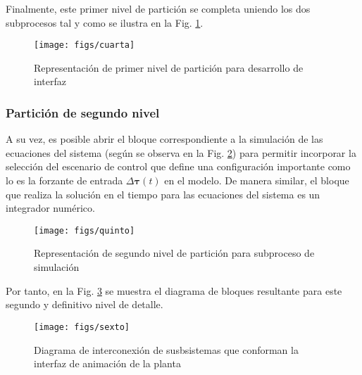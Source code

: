\noindent Finalmente, este primer nivel de partición se completa uniendo los dos subprocesos tal y como se ilustra en la Fig. \ref{1214}.
\begin{figure}
\centering
\caption[]{Representación de primer nivel de partición para desarrollo de interfaz}\label{1214}
\texttt{[image: figs/cuarta]}
\end{figure}

\subsubsection*{Partición de segundo nivel}
A su vez, es posible abrir el bloque correspondiente a la simulación de las ecuaciones del sistema (según se observa en la Fig. \ref{16}) para permitir incorporar la selección del escenario de control que define una configuración importante como lo es la forzante de entrada $\Delta\boldsymbol\tau(t)$ en el modelo. De manera similar, el bloque que realiza la solución en el tiempo para las ecuaciones del sistema es un integrador numérico.\\
\begin{figure}
\centering
\caption[]{Representación de segundo nivel de partición para subproceso de simulación}\label{16}
\texttt{[image: figs/quinto]}
\end{figure}

\noindent Por tanto, en la Fig. \ref{1515} se muestra el diagrama de bloques resultante para este segundo y definitivo nivel de detalle.
\begin{figure}
\centering
\caption[]{Diagrama de interconexión de susbsistemas que conforman la interfaz de animación de la planta}\label{1515}
\texttt{[image: figs/sexto]}
\end{figure}

